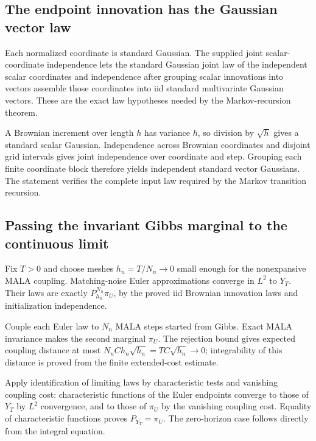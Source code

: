 \documentclass[11pt,a4paper]{report}
\begin{document}
\subsection{\texorpdfstring{The endpoint innovation has the Gaussian vector law}{The endpoint innovation has the Gaussian vector law}}
\label{report-step-UnadjustedLangevin-GibbsStationarity-lean-6}


Each normalized coordinate is standard Gaussian. The supplied joint scalar-coordinate independence lets the standard Gaussian joint law of the independent scalar coordinates and independence after grouping scalar innovations into vectors assemble those coordinates into iid standard multivariate Gaussian vectors. These are the exact law hypotheses needed by the Markov-recursion theorem.



A Brownian increment over length \(h\) has variance \(h\), so division by \(\sqrt h\) gives a standard scalar Gaussian. Independence across Brownian coordinates and disjoint grid intervals gives joint independence over coordinate and step. Grouping each finite coordinate block therefore yields independent standard vector Gaussians. The statement verifies the complete input law required by the Markov transition recursion.

\subsection{\texorpdfstring{Passing the invariant Gibbs marginal to the continuous limit}{Passing the invariant Gibbs marginal to the continuous limit}}
\label{report-step-UnadjustedLangevin-GibbsStationarity-lean-7}


Fix \(T>0\) and choose meshes \(h_n=T/N_n\to0\) small enough for the nonexpansive MALA coupling. Matching-noise Euler approximations converge in \(L^2\) to \(Y_T\). Their laws are exactly \(P_{h_n}^{N_n}\pi_U\), by the proved iid Brownian innovation laws and initialization independence.



Couple each Euler law to \(N_n\) MALA steps started from Gibbs. Exact MALA invariance makes the second marginal \(\pi_U\). The rejection bound gives expected coupling distance at most \(N_nC h_n\sqrt{h_n}=TC\sqrt{h_n}\to0\); integrability of this distance is proved from the finite extended-cost estimate.



Apply identification of limiting laws by characteristic tests and vanishing coupling cost: characteristic functions of the Euler endpoints converge to those of \(Y_T\) by \(L^2\) convergence, and to those of \(\pi_U\) by the vanishing coupling cost. Equality of characteristic functions proves \(P_{Y_T}=\pi_U\). The zero-horizon case follows directly from the integral equation.
\end{document}
